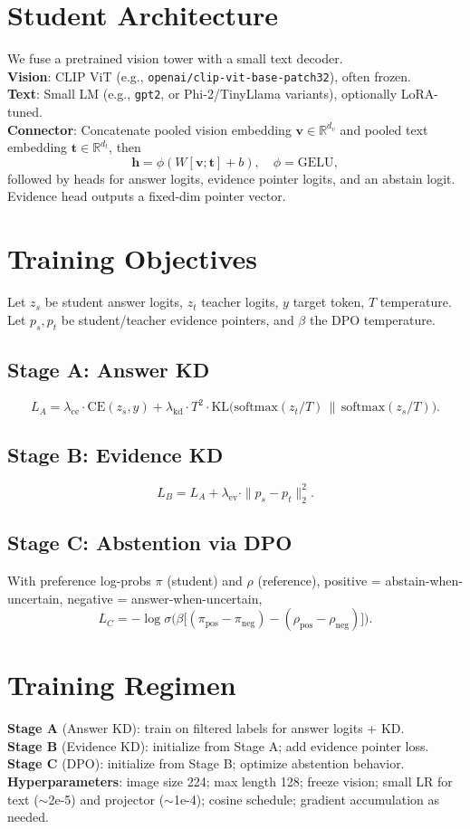 \documentclass[11pt]{article}
\begin{document}
\section{Student Architecture}
We fuse a pretrained vision tower with a small text decoder.\\
\textbf{Vision}: CLIP ViT (e.g., \texttt{openai/clip-vit-base-patch32}), often frozen.\\
\textbf{Text}: Small LM (e.g., \texttt{gpt2}, or Phi-2/TinyLlama variants), optionally LoRA-tuned.\\
\textbf{Connector}: Concatenate pooled vision embedding $\mathbf{v} \in \mathbb{R}^{d_v}$ and pooled text embedding $\mathbf{t} \in \mathbb{R}^{d_t}$, then
\[
\mathbf{h} = \phi(W[\mathbf{v};\mathbf{t}] + b), \quad \phi=\text{GELU},
\]
followed by heads for answer logits, evidence pointer logits, and an abstain logit. Evidence head outputs a fixed-dim pointer vector.

\section{Training Objectives}
Let $z_s$ be student answer logits, $z_t$ teacher logits, $y$ target token, $T$ temperature. Let $p_s, p_t$ be student/teacher evidence pointers, and $\beta$ the DPO temperature.
\subsection{Stage A: Answer KD}
\[
L_A = \lambda_{\text{ce}}\cdot \text{CE}(z_s, y) + \lambda_{\text{kd}}\cdot T^2 \cdot \text{KL}\big(\text{softmax}(z_t/T) \,\|\, \text{softmax}(z_s/T)\big).
\]
\subsection{Stage B: Evidence KD}
\[
L_B = L_A + \lambda_{\text{ev}}\cdot \|p_s - p_t\|_2^2.
\]
\subsection{Stage C: Abstention via DPO}
With preference log-probs $\pi$ (student) and $\rho$ (reference), positive = abstain-when-uncertain, negative = answer-when-uncertain,
\[
L_C = -\log \sigma\big(\beta\big[(\pi_{\text{pos}} - \pi_{\text{neg}}) - (\rho_{\text{pos}} - \rho_{\text{neg}})\big]\big).
\]

\section{Training Regimen}
\textbf{Stage A} (Answer KD): train on filtered labels for answer logits + KD.\\
\textbf{Stage B} (Evidence KD): initialize from Stage A; add evidence pointer loss.\\
\textbf{Stage C} (DPO): initialize from Stage B; optimize abstention behavior.\\
\textbf{Hyperparameters}: image size 224; max length 128; freeze vision; small LR for text ($\sim$2e-5) and projector ($\sim$1e-4); cosine schedule; gradient accumulation as needed.
\end{document}
